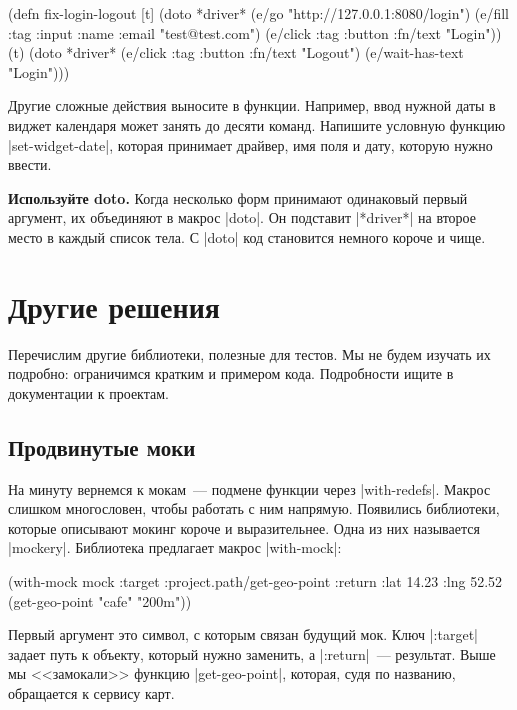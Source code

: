 \begin{english}
  \begin{clojure}
(defn fix-login-logout [t]
  (doto *driver*
    (e/go "http://127.0.0.1:8080/login")
    (e/fill {:tag :input :name :email} "test@test.com")
    (e/click {:tag :button :fn/text "Login"}))
  (t)
  (doto *driver*
    (e/click {:tag :button :fn/text "Logout"})
    (e/wait-has-text "Login")))
  \end{clojure}
\end{english}

Другие сложные действия выносите в функции. Например, ввод нужной даты в виджет
календаря может занять до десяти команд. Напишите условную функцию
\spverb|set-widget-date|, которая принимает драйвер, имя поля и дату, которую
нужно ввести.

\textbf{Используйте doto.} Когда несколько форм принимают одинаковый первый
аргумент, их объединяют в макрос \spverb|doto|. Он подставит \spverb|*driver*|
на второе место в каждый список тела. С \spverb|doto| код становится немного
короче и чище.

\section{Другие решения}

Перечислим другие библиотеки, полезные для тестов. Мы не будем изучать их
подробно: ограничимся кратким и примером кода. Подробности ищите в документации
к проектам.

\subsection{Продвинутые моки}

На минуту вернемся к мокам~--- подмене функции через
\spverb|with-redefs|. Макрос слишком многословен, чтобы работать с ним
напрямую. Появились библиотеки, которые описывают мокинг короче и
выразительнее. Одна из них называется
\spverb|mockery|. Библиотека
предлагает макрос \spverb|with-mock|:

\begin{english}
  \begin{clojure}
(with-mock mock
  {:target :project.path/get-geo-point
   :return {:lat 14.23 :lng 52.52}}
  (get-geo-point "cafe" "200m"))
  \end{clojure}
\end{english}

Первый аргумент это символ, с которым связан будущий мок. Ключ \spverb|:target|
задает путь к объекту, который нужно заменить, а \spverb|:return|~---
результат. Выше мы <<замокали>> функцию \spverb|get-geo-point|, которая, судя по
названию, обращается к сервису карт.

